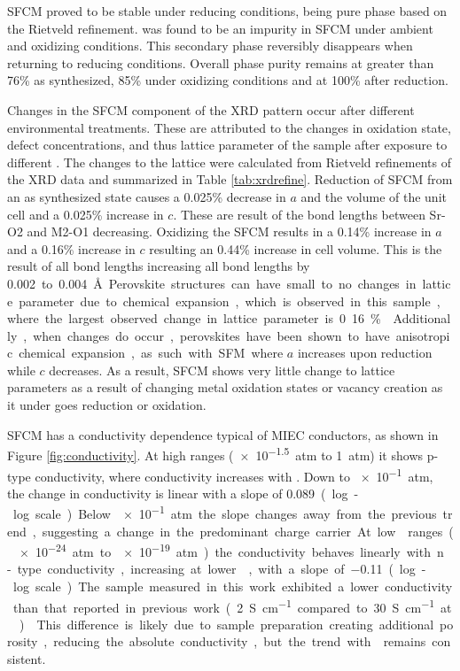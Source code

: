     SFCM proved to be stable under reducing conditions, being pure phase based on the Rietveld refinement.
     was found to be an impurity in SFCM under ambient and oxidizing conditions.
    This secondary phase reversibly disappears when returning to reducing conditions.
    Overall phase purity remains at greater than 76\% as synthesized, 85\% under oxidizing conditions and at 100\% after reduction.

    Changes in the SFCM component of the XRD pattern occur after different environmental treatments.
    These are attributed to the changes in oxidation state, defect concentrations, and thus lattice parameter of the sample after exposure to different .
    The changes to the lattice were calculated from Rietveld refinements of the XRD data and summarized in Table \ref{tab:xrdrefine}.
    Reduction of SFCM from an as synthesized state causes a 0.025\% decrease in $a$ and the volume of the unit cell and a 0.025\% increase in $c$.
    These are result of the bond lengths between Sr-O2 and M2-O1 decreasing.
    Oxidizing the SFCM results in a 0.14\% increase in $a$ and a 0.16\% increase in $c$ resulting an 0.44\% increase in cell volume.
    This is the result of all bond lengths increasing all bond lengths by \SI{0.002} to \SI{0.004}{\angstrom}.
    Perovskite structures can have small to no changes in lattice parameter due to chemical expansion, which is observed in this sample, where the largest observed change in lattice parameter is 0.16\%.\cite{Bishop2014}
    Additionally, when changes do occur, perovskites have been shown to have anisotropic chemical expansion, as such with SFM where $a$ increases upon reduction while $c$ decreases.\cite{Tsvetkov2016}
    As a result, SFCM shows very little change to lattice parameters as a result of changing metal oxidation states or vacancy creation as it under goes reduction or oxidation.

    SFCM has a conductivity dependence typical of MIEC conductors, as shown in Figure \ref{fig:conductivity}.
    At high  ranges (\SI{e-1.5}{atm} to \SI{1}{atm}) it shows p-type conductivity, where conductivity increases with .
    Down to \SI{e-1}{atm}, the change in conductivity is linear with a slope of \SI{0.089} (log-log scale).
    Below \SI{e-1}{atm} the slope changes away from the previous trend, suggesting a change in the predominant charge carrier.
    At low  ranges (\SI{e-24}{atm} to \SI{e-19}{atm}) the conductivity behaves linearly with n-type conductivity, increasing at lower , with a slope of \SI{-0.11} (log-log scale).
    The sample measured in this work exhibited a lower conductivity than that reported in previous work (\SI{2}{S\per\centi\meter} compared to \SI{30}{S\per\centi\meter} at ).\cite{Pan}
    This difference is likely due to sample preparation creating additional porosity, reducing the absolute conductivity, but the trend with  remains consistent.

